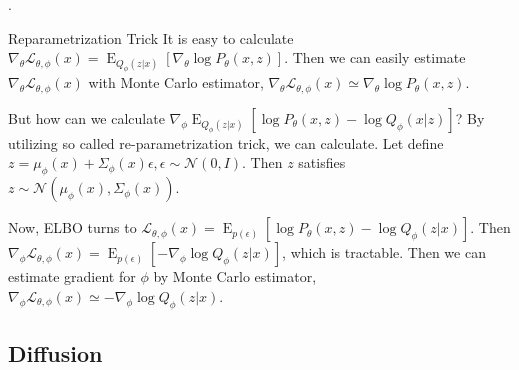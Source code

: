 \documentclass[8pt]{beamer}
\newcommand{\mc}[1]{\mathcal{#1}}
\newcommand{\expe}{\operatorname{E}}
\begin{document}
\begin{frame}{.}
    \begin{block}{Reparametrization Trick}
        It is easy to calculate $\nabla_\theta \mc{L}_{\theta, \phi}(x) = \expe_{Q_\phi (z|x)}[\nabla_\theta \log{P_\theta (x,z)}]$. Then we can easily estimate $\nabla_\theta \mc{L}_{\theta, \phi}(x)$ with Monte Carlo estimator, $\nabla_\theta \mc{L}_{\theta, \phi}(x) \simeq \nabla_\theta \log P_\theta(x,z)$.

        \bigskip
        But how can we calculate $\nabla_\phi \expe_{Q_\phi (z|x)}[\log P_\theta (x,z) - \log Q_\phi (x|z)]$?
        By utilizing so called re-parametrization trick, we can calculate.
        Let define $z = \mu_\phi(x) + \Sigma_\phi (x) \epsilon, \epsilon \sim \mc{N}(0,I)$. Then $z$ satisfies $z \sim \mc{N}(\mu_\phi(x), \Sigma_\phi(x))$.

        \bigskip

        Now, ELBO turns to $\mc{L}_{\theta, \phi} (x) = \expe_{p(\epsilon)}[\log P_\theta(x,z) - \log Q_\phi(z|x)]$. Then $\nabla_\phi \mc{L}_{\theta, \phi} (x) = \expe_{p(\epsilon)}[- \nabla_\phi \log Q_\phi (z|x)]$, which is tractable. Then we can estimate gradient for $\phi$ by Monte Carlo estimator, $\nabla_\phi \mc{L}_{\theta, \phi} (x) \simeq  - \nabla_\phi \log Q_\phi (z|x)$.
    \end{block}

\end{frame}

\subsection{Diffusion}
\end{document}
